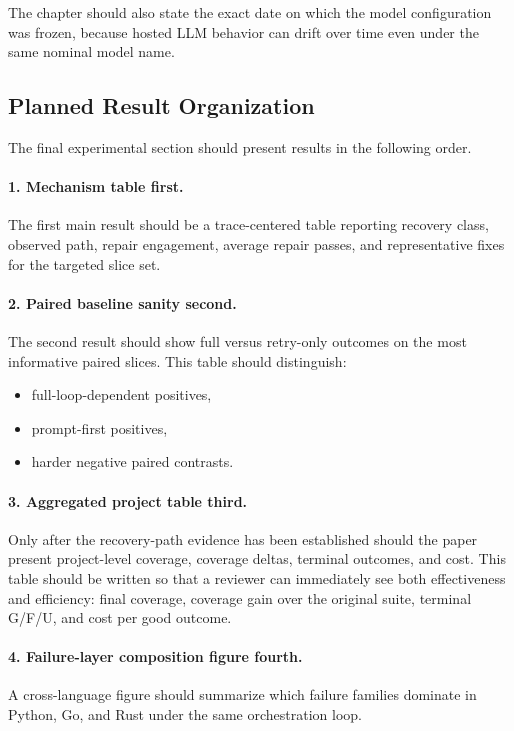 \documentclass[10pt]{article}
\begin{document}
The chapter should also state the exact date on which the model configuration was frozen, because hosted LLM behavior can drift over time even under the same nominal model name.

\subsection{Planned Result Organization}

The final experimental section should present results in the following order.

\paragraph{1. Mechanism table first.}
The first main result should be a trace-centered table reporting recovery class, observed path, repair engagement, average repair passes, and representative fixes for the targeted slice set.

\paragraph{2. Paired baseline sanity second.}
The second result should show full versus retry-only outcomes on the most informative paired slices. This table should distinguish:
\begin{itemize}[leftmargin=1.4em]
    \item full-loop-dependent positives,
    \item prompt-first positives,
    \item harder negative paired contrasts.
\end{itemize}

\paragraph{3. Aggregated project table third.}
Only after the recovery-path evidence has been established should the paper present project-level coverage, coverage deltas, terminal outcomes, and cost. This table should be written so that a reviewer can immediately see both effectiveness and efficiency: final coverage, coverage gain over the original suite, terminal G/F/U, and cost per good outcome.

\paragraph{4. Failure-layer composition figure fourth.}
A cross-language figure should summarize which failure families dominate in Python, Go, and Rust under the same orchestration loop.
\end{document}
